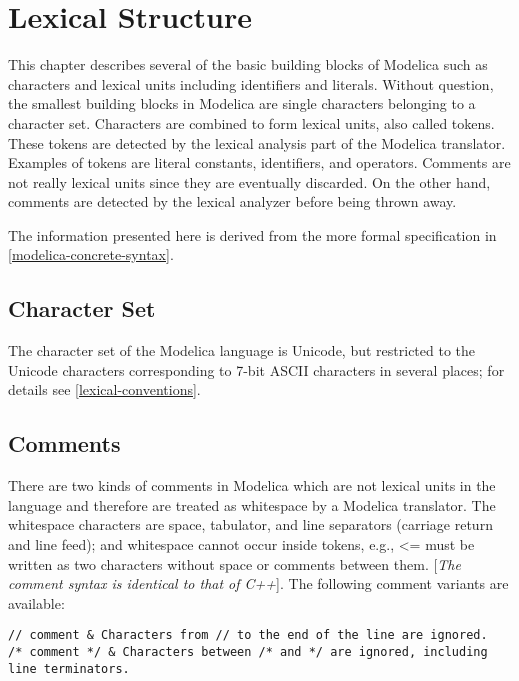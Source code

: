 \chapter{Lexical Structure}

This chapter describes several of the basic building blocks of Modelica
such as characters and lexical units including identifiers and literals.
Without question, the smallest building blocks in Modelica are single
characters belonging to a character set. Characters are combined to form
lexical units, also called tokens. These tokens are detected by the
lexical analysis part of the Modelica translator. Examples of tokens are
literal constants, identifiers, and operators. Comments are not really
lexical units since they are eventually discarded. On the other hand,
comments are detected by the lexical analyzer before being thrown away.

The information presented here is derived from the more formal
specification in \ref{modelica-concrete-syntax}.

\section{Character Set}

The character set of the Modelica language is Unicode, but restricted to
the Unicode characters corresponding to 7-bit ASCII characters in
several places; for details see \ref{lexical-conventions}.

\section{Comments}

There are two kinds of comments in Modelica which are not lexical units
in the language and therefore are treated as whitespace by a Modelica
translator. The whitespace characters are space, tabulator, and line
separators (carriage return and line feed); and whitespace cannot occur
inside tokens, e.g., \textless{}= must be written as two characters
without space or comments between them. {[}\emph{The comment syntax is
identical to that of C++}{]}. The following comment variants are
available:

\begin{lstlisting}[language=modelica]
// comment & Characters from // to the end of the line are ignored.
/* comment */ & Characters between /* and */ are ignored, including line terminators.
\end{lstlisting}

